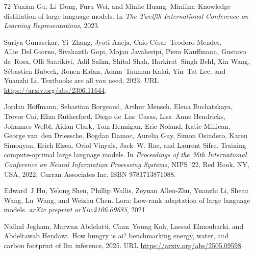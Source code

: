 \begin{thebibliography}{72}
Yuxian Gu, Li~Dong, Furu Wei, and Minlie Huang.
\newblock Minillm: Knowledge distillation of large language models.
\newblock In \emph{The Twelfth International Conference on Learning Representations}, 2023.

Suriya Gunasekar, Yi~Zhang, Jyoti Aneja, Caio César~Teodoro Mendes, Allie~Del Giorno, Sivakanth Gopi, Mojan Javaheripi, Piero Kauffmann, Gustavo de~Rosa, Olli Saarikivi, Adil Salim, Shital Shah, Harkirat~Singh Behl, Xin Wang, Sébastien Bubeck, Ronen Eldan, Adam~Tauman Kalai, Yin~Tat Lee, and Yuanzhi Li.
\newblock Textbooks are all you need, 2023.
\newblock URL \url{https://arxiv.org/abs/2306.11644}.

Jordan Hoffmann, Sebastian Borgeaud, Arthur Mensch, Elena Buchatskaya, Trevor Cai, Eliza Rutherford, Diego de~Las~Casas, Lisa~Anne Hendricks, Johannes Welbl, Aidan Clark, Tom Hennigan, Eric Noland, Katie Millican, George van~den Driessche, Bogdan Damoc, Aurelia Guy, Simon Osindero, Karen Simonyan, Erich Elsen, Oriol Vinyals, Jack~W. Rae, and Laurent Sifre.
\newblock Training compute-optimal large language models.
\newblock In \emph{Proceedings of the 36th International Conference on Neural Information Processing Systems}, NIPS '22, Red Hook, NY, USA, 2022. Curran Associates Inc.
\newblock ISBN 9781713871088.

Edward~J Hu, Yelong Shen, Phillip Wallis, Zeyuan Allen-Zhu, Yuanzhi Li, Shean Wang, Lu~Wang, and Weizhu Chen.
\newblock Lora: Low-rank adaptation of large language models.
\newblock \emph{arXiv preprint arXiv:2106.09685}, 2021.

Nidhal Jegham, Marwan Abdelatti, Chan~Young Koh, Lassad Elmoubarki, and Abdeltawab Hendawi.
\newblock How hungry is ai? benchmarking energy, water, and carbon footprint of llm inference, 2025.
\newblock URL \url{https://arxiv.org/abs/2505.09598}.


\end{thebibliography}
